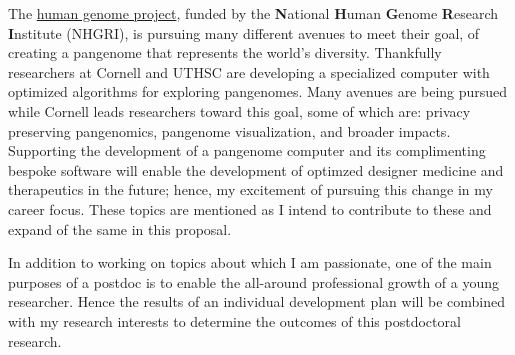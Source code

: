 The \href{https://humanpangenome.org/about-us/}{human genome project}, funded by the \textbf{N}ational \textbf{H}uman \textbf{G}enome \textbf{R}esearch \textbf{I}nstitute (NHGRI), is pursuing many different avenues to meet their goal, of creating a pangenome that represents the world's diversity.  
Thankfully researchers at Cornell and UTHSC are developing a specialized computer with optimized algorithms for exploring pangenomes.
Many avenues are being pursued while Cornell leads researchers toward this goal, some of which are: privacy preserving pangenomics, pangenome visualization, and broader impacts.
Supporting the development of a pangenome computer and its complimenting bespoke software will enable the development of optimzed designer medicine and therapeutics in the future; hence, my excitement of pursuing this change in my career focus.
These topics are mentioned as I intend to contribute to these and expand of the same in this proposal.




In addition to working on topics about which I am passionate, one of the main purposes of a postdoc is to enable the all-around professional growth of a young researcher.
Hence the results of an individual development plan will be combined with my research interests to determine the outcomes of this postdoctoral research.